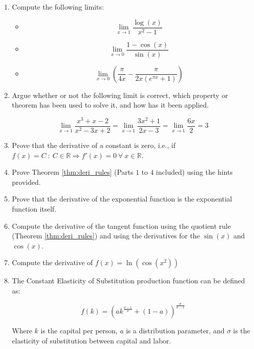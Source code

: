 \documentclass[11pt]{article}
\providecommand{\tightlist}{%
      \setlength{\itemsep}{0pt}\setlength{\parskip}{0pt}}
\theoremstyle{definition}
\theoremstyle{plain}
\begin{document}
\begin{enumerate}
\item Compute the following limits:

    \begin{itemize}
    \tightlist
    \item
    \[\displaystyle\lim_{x\rightarrow 1}{\dfrac{\log(x)}{x^2 - 1}}\]
    \item
    \[\displaystyle\lim_{x\rightarrow 0}{\dfrac{1-\cos(x)}{\sin(x)}}\]
    \item
    \[
    \lim_{x\rightarrow 0}\left(\frac{\pi}{4x} - \frac{\pi}{2x(e^{\pi x}+1)}\right)
    \]
    \end{itemize}

\item Argue whether or not the following limit is correct, which property or theorem has been used to solve it, and how has it been applied.

\[
\lim_{x\rightarrow 1}\frac{x^3+x-2}{x^2-3x+2} = \lim_{x\rightarrow 1}\frac{3x^2+1}{2x-3} = \lim_{x\rightarrow 1}\frac{6x}{2} = 3
\]

\item Prove that the derivative of a constant is zero, i.e., if $f(x) = C \: : \: C\in\mathbb{R} \Rightarrow f'(x) = 0 \: \forall \: x\in\mathbb{R}$.

\item Prove Theorem \ref{thm:deri_rules} (Parts $1$ to $4$ included) using the hints provided.


\item Prove that the derivative of the exponential function is the exponential function itself.

\item Compute the derivative of the tangent function using the quotient rule (Theorem \ref{thm:deri_rules}) and using the derivatives for the \(\sin(x)\) and \(\cos(x)\).

\item Compute the derivative of \(f(x) = \ln\left(\cos\left(x^2\right)\right)\)

\item The Constant Elasticity of Substitution production
function can be defined as:

\[
f(k) = \left(a k^{\frac{\sigma-1}{\sigma}} + (1-a)\right)^{\frac{\sigma}{\sigma-1}}
\]

Where \(k\) is the capital per person, \(a\) is a distribution
parameter, and \(\sigma\) is the elasticity of substitution between
capital and labor.


\end{enumerate}
\end{document}
